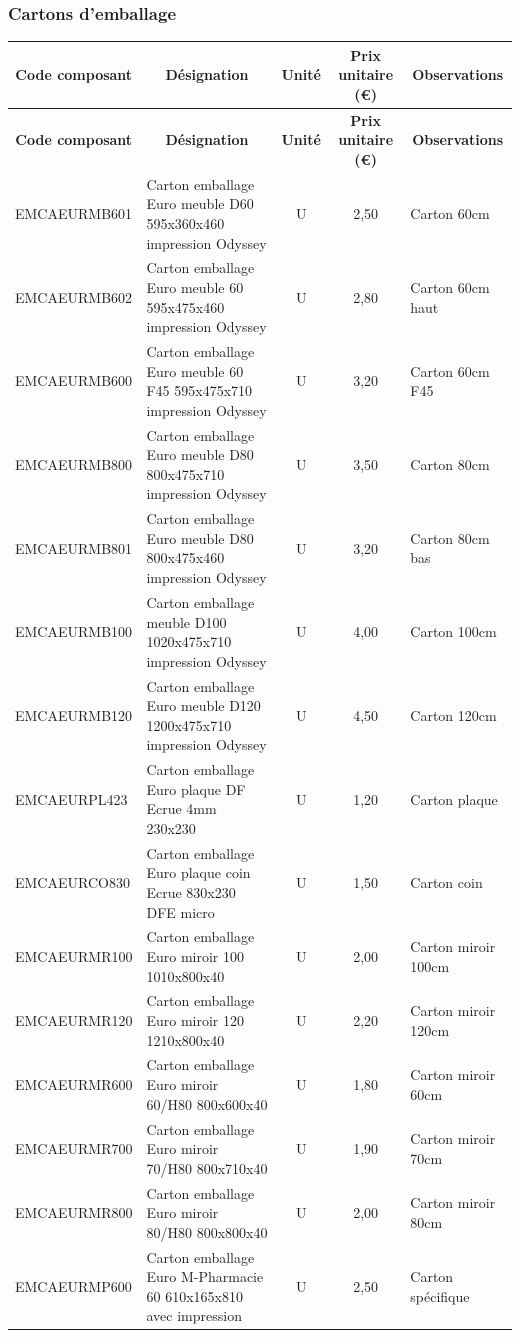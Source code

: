 \documentclass[12pt,a4paper]{article}
\begin{document}
\subsubsection{Cartons d'emballage}

\begin{longtable}{|p{4cm}|p{7cm}|c|c|p{2cm}|}
\hline
\multicolumn{1}{|c|}{\textbf{Code composant}} & \multicolumn{1}{c|}{\textbf{Désignation}} & \multicolumn{1}{c|}{\textbf{Unité}} & \multicolumn{1}{c|}{\textbf{Prix unitaire (€)}} & \multicolumn{1}{c|}{\textbf{Observations}} \\
\hline
\endfirsthead
\hline
\multicolumn{1}{|c|}{\textbf{Code composant}} & \multicolumn{1}{c|}{\textbf{Désignation}} & \multicolumn{1}{c|}{\textbf{Unité}} & \multicolumn{1}{c|}{\textbf{Prix unitaire (€)}} & \multicolumn{1}{c|}{\textbf{Observations}} \\
\hline
\endhead
\hline
\endfoot
EMCAEURMB601 & Carton emballage Euro meuble D60 595x360x460 impression Odyssey & U & 2,50 & Carton 60cm \\
EMCAEURMB602 & Carton emballage Euro meuble 60 595x475x460 impression Odyssey & U & 2,80 & Carton 60cm haut \\
EMCAEURMB600 & Carton emballage Euro meuble 60 F45 595x475x710 impression Odyssey & U & 3,20 & Carton 60cm F45 \\
EMCAEURMB800 & Carton emballage Euro meuble D80 800x475x710 impression Odyssey & U & 3,50 & Carton 80cm \\
EMCAEURMB801 & Carton emballage Euro meuble D80 800x475x460 impression Odyssey & U & 3,20 & Carton 80cm bas \\
EMCAEURMB100 & Carton emballage meuble D100 1020x475x710 impression Odyssey & U & 4,00 & Carton 100cm \\
EMCAEURMB120 & Carton emballage Euro meuble D120 1200x475x710 impression Odyssey & U & 4,50 & Carton 120cm \\
EMCAEURPL423 & Carton emballage Euro plaque DF Ecrue 4mm 230x230 & U & 1,20 & Carton plaque \\
EMCAEURCO830 & Carton emballage Euro plaque coin Ecrue 830x230 DFE micro & U & 1,50 & Carton coin \\
EMCAEURMR100 & Carton emballage Euro miroir 100 1010x800x40 & U & 2,00 & Carton miroir 100cm \\
EMCAEURMR120 & Carton emballage Euro miroir 120 1210x800x40 & U & 2,20 & Carton miroir 120cm \\
EMCAEURMR600 & Carton emballage Euro miroir 60/H80 800x600x40 & U & 1,80 & Carton miroir 60cm \\
EMCAEURMR700 & Carton emballage Euro miroir 70/H80 800x710x40 & U & 1,90 & Carton miroir 70cm \\
EMCAEURMR800 & Carton emballage Euro miroir 80/H80 800x800x40 & U & 2,00 & Carton miroir 80cm \\
EMCAEURMP600 & Carton emballage Euro M-Pharmacie 60 610x165x810 avec impression & U & 2,50 & Carton spécifique \\
\hline
\end{longtable}
\end{document}
